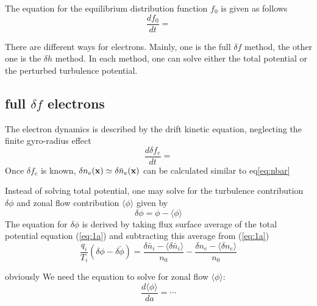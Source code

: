 \documentclass{report}
\newcommand{\ff}[2]{\frac{#1}{#2}}
\def\x{\mbox{\bf x}}
\begin{document}
The equation for the equilibrium distribution function $f_0$ is given as follows
\begin{equation}
\label{eq:f0}
\ff{df_0}{dt} =
\end{equation}

There are different ways for electrons. Mainly,
one is the full $\delta f$ method,
the other one is the $\delta h$ method.
In each method, one can solve either the total potential 
or the perturbed turbulence potential.


\subsection{full $\delta f$ electrons}
The electron dynamics is described by the drift kinetic equation, 
neglecting the finite gyro-radius effect
\begin{equation}
\label{eq:edrifteq_df}
\ff{d \delta f_e}{dt} =
\end{equation}
Once $\delta f_e$ is known, 
$\delta n_e(\x) \simeq \delta \bar{n}_e(\x)$ can be calculated similar to eq\ref{eq:nbar}
\fi

\noindent
Instead of solving total potential, 
one may solve for the turbulence contribution $\delta \phi$ 
and zonal flow contribution $\langle \phi \rangle$ 
given by
$$
\delta \phi = \phi - \langle \phi \rangle
$$
The equation for $\delta \phi$ is derived by
taking flux surface average of the total potential equation (\ref{eq:1a})
and subtracting this average from (\ref{eq:1a})
\begin{equation}
\label{eq:1b}
\ff{q_i}{T_i} (\delta \phi - \delta \tilde{\phi}) = 
 \ff{\delta \bar{n}_i - \langle \delta \bar{n}_i \rangle}{n_0} - 
 \ff{\delta n_e - \langle \delta n_e \rangle}{n_0}
\end{equation}

\iffalse
obviously We need the equation to solve for zonal flow 
$\langle \phi \rangle$:
$$
\ff{d\langle \phi \rangle}{da} = \cdots
$$
\end{document}
